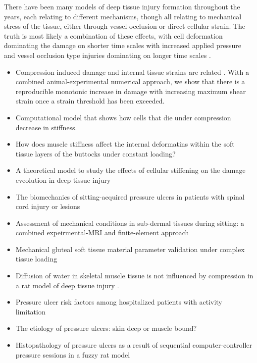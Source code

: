 			There have been many models of deep tissue injury formation throughout the years, each relating to different mechanisms, though all relating to mechanical stress of the tissue, either through vessel occlusion or direct cellular strain. The truth is most likely a combination of these effects, with cell deformation dominating the damage on shorter time scales with increased applied pressure and vessel occlusion type injuries dominating on longer time scales \cite{stekelenburg08}.

			\begin{itemize}
				\item Compression induced damage and internal tissue strains are related \cite{ceelen08}. With a combined animal-experimental numerical approach, we show that there is a reproducible monotonic increase in damage with increasing maximum shear strain once a strain threshold has been exceeded.
				\item Computational model that shows how cells that die under compression decrease in stiffness. \cite{ceelen08-8}
				\item How does muscle stiffness affect the internal deformatins within the soft tissue layers of the buttocks under constant loading? \cite{loerakker13}
				\item A theoretical model to study the effects of cellular stiffening on the damage eveolution in deep tissue injury \cite{nagel09}
				\item The biomechanics of sitting-acquired pressure ulcers in patients with spinal cord injury or lesions \cite{gefen07-9}
				\item Assessment of mechanical conditions in sub-dermal tissues during sitting: a combined expeirmental-MRI and finite-element approach \cite{linderganz06}
				\item Mechanical gluteal soft tissue material parameter validation under complex tissue loading \cite{then09}
				\item Diffusion of water in skeletal muscle tissue is not influenced by compression in a rat model of deep tissue injury \cite{vanNierop10}.
				\item Pressure ulcer risk factors among hospitalized patients with activity limitation \cite{allman95}
				\item The etiology of pressure ulcers: skin deep or muscle bound? \cite{bouten03}
				\item Histopathology of pressure ulcers as a result of sequential computer-controller pressure sessions in a fuzzy rat model \cite{salcido94}

\end{itemize}
